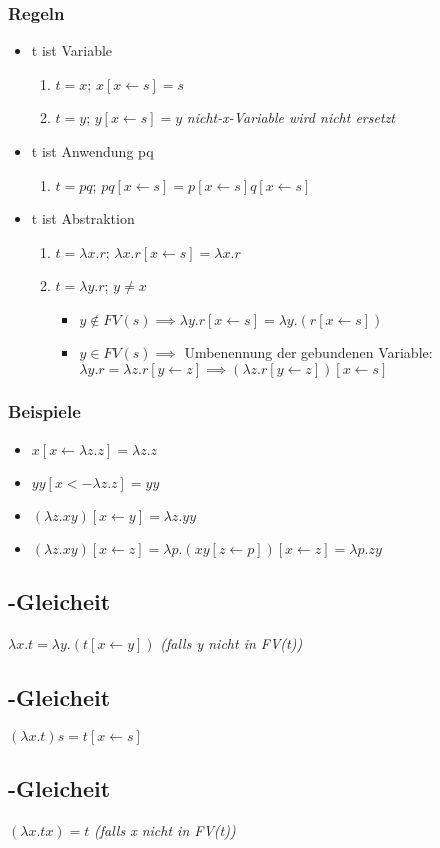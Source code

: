 \subsubsection{Regeln}
\begin{itemize}
    \item t ist Variable
    \begin{enumerate}
        \item $t=x$; $x[x\leftarrow s]=s$
        \item $t=y$; $y[x\leftarrow s]=y$ \textit{nicht-x-Variable wird nicht ersetzt}
    \end{enumerate}
    \item t ist Anwendung pq
    \begin{enumerate}
        \item $t=pq$; $pq[x\leftarrow s]=p[x\leftarrow s] q[x\leftarrow s]$
    \end{enumerate}
    \item t ist Abstraktion
    \begin{enumerate}
        \item $t=\lambda x.r$; $\lambda x.r[x\leftarrow s]=\lambda x.r$
        \item $t=\lambda y.r$; $y\neq x$
        \begin{itemize}
            \item $y \notin FV(s) \implies \lambda y.r[x\leftarrow s]=\lambda y.(r[x\leftarrow s])$
            \item $y \in FV(s) \implies$ Umbenennung der gebundenen Variable:\\
                  $\lambda y.r = \lambda z.r[y\leftarrow z] \implies (\lambda z.r[y\leftarrow z])[x\leftarrow s]$
        \end{itemize}
    \end{enumerate}
\end{itemize}

\subsubsection{Beispiele}
\begin{itemize}
    \item $x[x\leftarrow \lambda z.z] = \lambda z.z$
    \item $yy[x<-\lambda z.z] = yy$
    \item $(\lambda z.xy)[x\leftarrow y] = \lambda z.yy$
    \item $(\lambda z.xy)[x\leftarrow z] = \lambda p.(xy[z\leftarrow p])[x\leftarrow z] = \lambda p.zy$
\end{itemize}

\subsection{\alpha -Gleicheit}
$\lambda x.t = \lambda y.(t[x\leftarrow y])$ \textit{(falls y nicht in FV(t))}

\subsection{\beta -Gleicheit}
$(\lambda x.t)s = t[x\leftarrow s]$

\subsection{\eta -Gleicheit}
$(\lambda x.tx) = t$ \textit{(falls x nicht in FV(t))}
